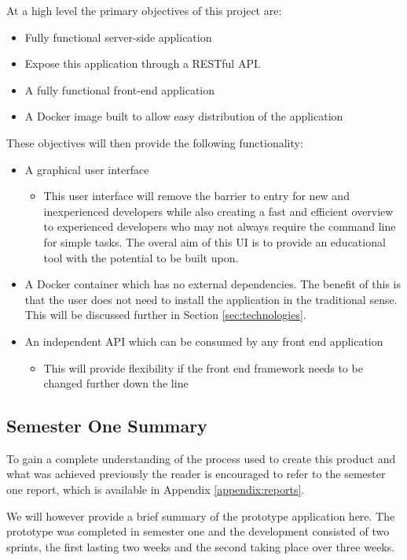 At a high level the primary objectives of this project are:

\begin{itemize}
	\item Fully functional server-side application
	\item Expose this application through a \gls{REST}ful API.
	\item A fully functional front-end application
	\item A \gls{Docker image} built to allow easy distribution of the application
\end{itemize}

These objectives will then provide the following functionality:

\begin{itemize}
	\item A graphical user interface
	\begin{itemize}
		\item This user interface will remove the barrier to entry for new and inexperienced developers while also creating a fast and efficient overview to experienced developers who may not always require the command line for simple tasks. The overal aim of this \gls{UI} is to provide an educational tool with the potential to be built upon.
	\end{itemize}
	\item A \gls{Docker container} which has no external dependencies. The benefit of this is that the user does not need to install the application in the traditional sense. This will be discussed further in Section \ref{sec:technologies}.
	\item An independent API which can be consumed by any front end application
	\begin{itemize}
		\item This will provide flexibility if the front end framework needs to be changed further down the line
	\end{itemize}
\end{itemize}

\subsection{Semester One Summary}
To gain a complete understanding of the process used to create this product and what was achieved previously the reader is encouraged to refer to the semester one report, which is available in Appendix \ref{appendix:reports}.

We will however provide a brief summary of the prototype application here. The prototype was completed in semester one and the development consisted of two \glspl{sprint}, the first lasting two weeks and the second taking place over three weeks.


